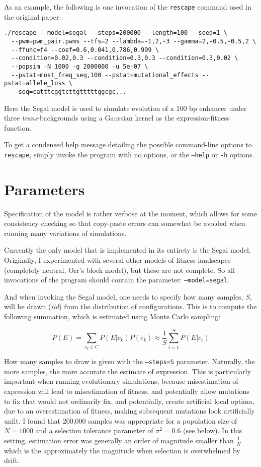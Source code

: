 \documentclass[11pt]{article}
\begin{document}
As an example, the following is one invocation of the \texttt{rescape} command used in the original paper:

\begin{verbatim}
./rescape --model=segal --steps=200000 --length=100 --seed=1 \
  --pwm=pwm_pair.pwms --tfs=2 --lambda=-1,2,-3 --gamma=2,-0.5,-0.5,2 \
  --ffunc=f4 --coef=0.6,0.041,0.786,0.999 \
  --condition=0.02,0.3 --condition=0.3,0.3 --condition=0.3,0.02 \
  --popsim -N 1000 -g 2000000 -u 5e-07 \
  --pstat=most_freq_seq,100 --pstat=mutational_effects --pstat=allele_loss \
  --seq=catttcggtcttgtttttggcgc...
\end{verbatim}

\noindent Here the Segal model is used to simulate evolution of a 100 bp enhancer under three \emph{trans}-backgrounds using a Gaussian kernel as the expression-fitness function.

To get a condensed help message detailing the possible command-line options to \texttt{rescape}, simply invoke the program with no options, or the \texttt{--help} or \texttt{-h} options.

\section{Parameters}

Specification of the model is rather verbose at the moment, which allows for some consistency checking so that copy-paste errors can somewhat be avoided when running many variations of simulations. 

Currently the only model that is implemented in its entirety is the Segal model. Originally, I experimented with several other models of fitness landscapes (completely neutral, Orr's block model), but these are not complete. So all invocations of the program should contain the parameter: \texttt{--model=segal}.

And when invoking the Segal model, one needs to specify how many samples, $S$, will be drawn (\emph{iid}) from the distribution of configurations. This is to compute the following summation, which is estimated using Monte Carlo sampling: 

\begin{displaymath}
P(E) = \sum_{c_k \in C}P(E|c_k)P(c_k) \approx \frac{1}{S}\sum_{i=1}^{S}P(E|c_i) 
\end{displaymath}

\noindent How many samples to draw is given with the \texttt{--steps=S} parameter. Naturally, the more samples, the more accurate the estimate of expression. This is particularly important when running evolutionary simulations, because misestimation of expression will lead to misestimation of fitness, and potentially allow mutations to fix that would not ordinarily fix, and potentially, create artificial local optima, due to an overestimation of fitness, making subsequent mutations look artificially unfit. I found that 200,000 samples was appropriate for a population size of $N=1000$ and a selection tolerance parameter of $\sigma^2 = 0.6$ (see below). In this setting, estimation error was generally an order of magnitude smaller than $\frac{1}{N}$ which is the approximately the magnitude when selection is overwhelmed by drift.
\end{document}

